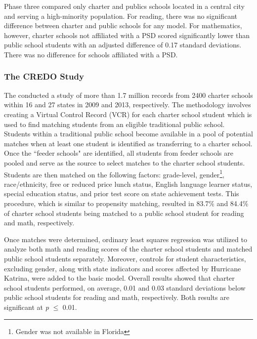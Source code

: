 \documentclass[letterpaper,12p,twoside]{article} %
\begin{document}
Phase three compared only charter and publics schools located in a central city and serving a high-minority population. For reading, there was no significant difference between charter and public schools for any model. For mathematics, however, charter schools not affiliated with a PSD scored significantly lower than public school students with an adjusted difference of 0.17 standard deviations. There was no difference for schools affiliated with a PSD. 



\subsubsection{The CREDO Study}

The  conducted a study of more than 1.7 million records from 2400 charter schools within 16 and 27 states in 2009 and 2013, respectively. The methodology involves creating a Virtual Control Record (VCR) for each charter school student \cite<see also,>{AbadieDiamondHainueller2007,nea} which is used to find matching students from an eligible traditional public school. Students within a traditional public school become available in a pool of potential matches when at least one student is identified as transferring to a charter school. Once the ``feeder schools" are identified, all students from feeder schools are pooled and serve as the source to select matches to the charter school students. Students are then matched on the following factors: grade-level, gender\footnote{Gender was not available in Florida}, race/ethnicity, free or reduced price lunch status, English language learner status, special education status, and prior test score on state achievement tests. This procedure, which is similar to propensity matching, resulted in 83.7\% and 84.4\% of charter school students being matched to a public school student for reading and math, respectively.

Once matches were determined, ordinary least squares regression was utilized to analyze both math and reading scores of the charter school students and matched public school students separately. Moreover, controls for student characteristics, excluding gender, along with state indicators and scores affected by Hurricane Katrina, were added to the basic model. Overall results showed that charter school students performed, on average, 0.01 and 0.03 standard deviations below public school students for reading and math, respectively. Both results are significant at \textit{p} $\leq$ 0.01.
\end{document}
